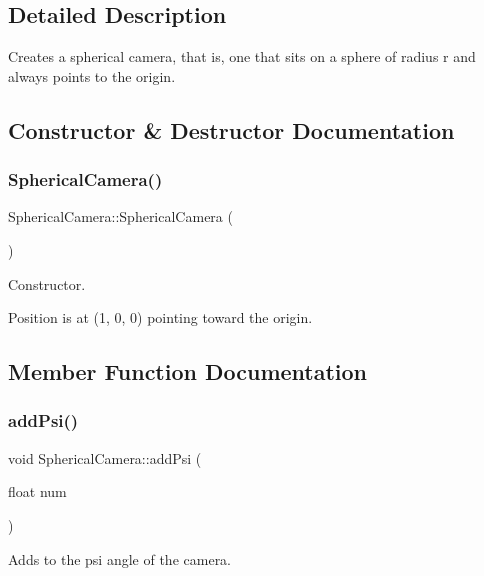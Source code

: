 \subsection{Detailed Description}
Creates a spherical camera, that is, one that sits on a sphere of radius r and always points to the origin. 

\subsection{Constructor \& Destructor Documentation}
\mbox{\label{class_spherical_camera_a65579bdc58bd5af9828d2174ac502f3f}} 
\subsubsection{\texorpdfstring{Spherical\+Camera()}{SphericalCamera()}}
{\footnotesize\ttfamily Spherical\+Camera\+::\+Spherical\+Camera (\begin{DoxyParamCaption}{ }\end{DoxyParamCaption})}



Constructor. 

Position is at (1, 0, 0) pointing toward the origin. 

\subsection{Member Function Documentation}
\mbox{\label{class_spherical_camera_aa730ca48a2b4ce7ef2bef71d7fe01cdb}} 
\subsubsection{\texorpdfstring{add\+Psi()}{addPsi()}}
{\footnotesize\ttfamily void Spherical\+Camera\+::add\+Psi (\begin{DoxyParamCaption}\item[{float}]{num }\end{DoxyParamCaption})}



Adds to the psi angle of the camera. 


